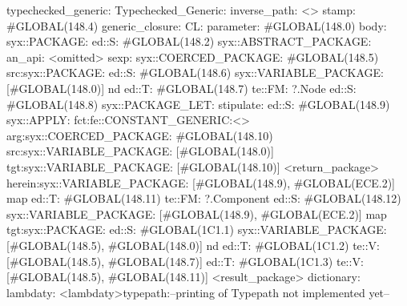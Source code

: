 typechecked_generic:
Typechecked_Generic:
inverse_path: <>
stamp: #GLOBAL(148.4)
generic_closure:
CL:
parameter: #GLOBAL(148.0)
body: syx::PACKAGE:
        ed::S: #GLOBAL(148.2)
            syx::ABSTRACT_PACKAGE:
                an_api: <omitted>
                sexp:
                    syx::COERCED_PACKAGE:
                        #GLOBAL(148.5)
                         src:syx::PACKAGE:
                                ed::S: #GLOBAL(148.6) syx::VARIABLE_PACKAGE: [#GLOBAL(148.0)] nd
                                ed::T: #GLOBAL(148.7) te::FM: ?.Node
                                    ed::S: #GLOBAL(148.8)
                                        syx::PACKAGE_LET:
                                            stipulate:  ed::S: #GLOBAL(148.9)
                                                            syx::APPLY:
                                                                fct:fe::CONSTANT_GENERIC:<>
                                                                arg:syx::COERCED_PACKAGE:
                                                                        #GLOBAL(148.10)
                                                                         src:syx::VARIABLE_PACKAGE:
                                                                         [#GLOBAL(148.0)]
                                                                        tgt:syx::VARIABLE_PACKAGE:
                                                                         [#GLOBAL(148.10)]
                                                         <return_package>
                                            herein:syx::VARIABLE_PACKAGE:
                                             [#GLOBAL(148.9), #GLOBAL(ECE.2)]
                                     map
                                ed::T: #GLOBAL(148.11) te::FM: ?.Component
                            ed::S: #GLOBAL(148.12)
                             syx::VARIABLE_PACKAGE:
                             [#GLOBAL(148.9), #GLOBAL(ECE.2)]
                             map
                        tgt:syx::PACKAGE:
                            ed::S: #GLOBAL(1C1.1)
                             syx::VARIABLE_PACKAGE:
                             [#GLOBAL(148.5), #GLOBAL(148.0)]
                             nd
                            ed::T: #GLOBAL(1C1.2)
                             te::V:
                             [#GLOBAL(148.5), #GLOBAL(148.7)]
                            ed::T: #GLOBAL(1C1.3)
                             te::V:
                             [#GLOBAL(148.5), #GLOBAL(148.11)]
         <result_package>
dictionary:
lambdaty:
  <lambdaty>typepath:--printing of Typepath not implemented yet--

